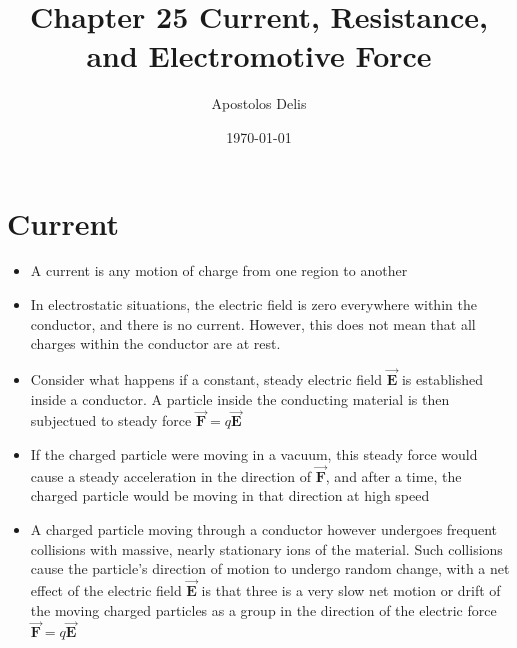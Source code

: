 \documentclass[11pt, a4paper]{article}
\begin{document}
\title{Chapter 25 Current, Resistance, and Electromotive Force}
\author{Apostolos Delis}
\date{\today}
\maketitle

\tableofcontents
\section[25.1 Current]{Current}
\begin{itemize}
    \item A current is any motion of charge from one region to another
    \item In electrostatic situations, the electric field is zero everywhere within the
        conductor, and there is no current. However, this does not mean that all charges
        within the conductor are at rest.
    \item Consider what happens if a constant, steady electric field $\vec{\mathbf{E}}$
        is established inside a conductor. A particle inside the conducting material is
        then subjectued to steady force $\vec{\mathbf{F}} = q \vec{\mathbf{E}}$
    \item If the charged particle were moving in a vacuum, this steady force would cause
        a steady acceleration in the direction of $\vec{\mathbf{F}}$, and after a time,
        the charged particle would be moving in that direction at high speed
    \item A charged particle moving through a conductor however undergoes frequent
        collisions with massive, nearly stationary ions of the material. Such collisions
        cause the particle's direction of motion to undergo random change, with a net
        effect of the electric field $\vec{\mathbf{E}}$ is that three is a very slow net
        motion or drift of the moving charged particles as a group in the direction of
        the electric force $\vec{\mathbf{F}} = q \vec{\mathbf{E}}$
\end{itemize}
\end{document}
